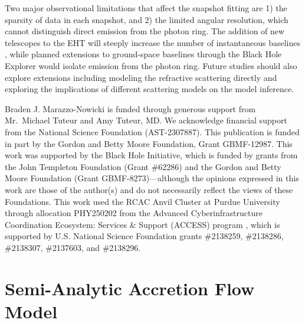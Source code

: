 \documentclass[linenumbers, twocolumn, tighten]{aastex701}
\begin{document}
Two major observational limitations that affect the snapshot fitting are 1) the sparsity of data in each snapshot, and 2) the limited angular resolution, which cannot distinguish direct emission from the photon ring. The addition of new telescopes to the EHT will steeply increase the number of instantaneous baselines \citep{EHT_Mid-Range,ngEHT_Key_Science,Doeleman_2023}, while planned extensions to ground-space baselines through the Black Hole Explorer \citep[BHEX;][]{BHEX_Concept,BHEX_Instrument,BHEX_Photon_Ring} would isolate emission from the photon ring. Future studies should also explore extensions including modeling the refractive scattering directly and exploring the implications of different scattering models on the model inference. 


\begin{acknowledgments}

Braden J. Marazzo-Nowicki is funded through generous support from Mr.\ Michael Tuteur and Amy Tuteur, MD.
We acknowledge financial support from the National Science Foundation (AST-2307887). This publication is funded in part by the Gordon and Betty Moore Foundation, Grant GBMF-12987. This work was supported by the Black Hole Initiative, which is funded by grants from the John Templeton Foundation (Grant \#62286) and the Gordon and Betty Moore Foundation
(Grant GBMF-8273)---although the opinions expressed in this work are those of the author(s) and do not necessarily reflect the views of these Foundations. This work used the RCAC Anvil Cluster at Purdue University through allocation PHY250202 from the Advanced Cyberinfrastructure Coordination Ecosystem: Services \& Support (ACCESS) program \citealt{10.1145/3569951.3597559}, which is supported by U.S. National Science Foundation grants \#2138259, \#2138286, \#2138307, \#2137603, and \#2138296.
    
\end{acknowledgments}




\appendix

\section{Semi-Analytic Accretion Flow Model}\label{sec:model-appendix}
\end{document}
